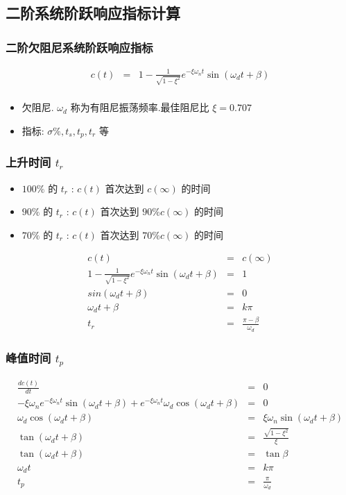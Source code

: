 \documentclass{article}
\begin{document}
\subsection{二阶系统阶跃响应指标计算}
\label{sec-1-3}
\begin{frame}
\frametitle{二阶欠阻尼系统阶跃响应指标}
\label{sec-1-3-1}


\begin{eqnarray*}
   c(t)  &=& 1-\frac{1}{\sqrt{1-\xi^2}}e^{-\xi\omega_n t}\sin(\omega_d t+\beta)\\
\end{eqnarray*}

\begin{itemize}
\item 欠阻尼. $\omega_d$ 称为有阻尼振荡频率.最佳阻尼比 $\xi=0.707$
\item 指标: $\sigma\% , t_s , t_p , t_r$ 等
\end{itemize}
\end{frame}
\begin{frame}
\frametitle{上升时间 $t_r$}
\label{sec-1-3-2}

\begin{itemize}
\item $100\%$ 的 $t_r$ : $c(t)$ 首次达到 $c(\infty)$ 的时间
\item $90\%$ 的 $t_r$ : $c(t)$ 首次达到 $90\%c(\infty)$ 的时间
\item $70\%$ 的 $t_r$ : $c(t)$ 首次达到 $70\%c(\infty)$ 的时间
\end{itemize}

\begin{eqnarray*}
c(t) & = & c(\infty) \\
1-\frac{1}{\sqrt{1-\xi^2}}e^{-\xi\omega_n t}\sin(\omega_d t+\beta) &=& 1 \\
sin(\omega_d t+\beta) &=& 0 \\
\omega_d t+\beta &=& k\pi \\
t_r &=& \frac{\pi-\beta}{\omega_d}
\end{eqnarray*}
\end{frame}
\begin{frame}
\frametitle{峰值时间 $t_p$}
\label{sec-1-3-3}



\begin{eqnarray*}
\frac{dc(t)}{dt} &=& 0 \\
-\xi\omega_n e^{-\xi\omega_n t}\sin(\omega_d t+\beta)+e^{-\xi\omega_n t}\omega_d\cos(\omega_d t+\beta) & = & 0 \\
\omega_d\cos(\omega_d t+\beta) &=& \xi\omega_n \sin(\omega_d t+\beta) \\
\tan(\omega_d t+\beta) &=& \frac{\sqrt{1-\xi^2}}{\xi} \\
\tan(\omega_d t+\beta) &=& \tan\beta \\
\omega_d t &=& k\pi\\
t_p &=& \frac{\pi}{\omega_d}
\end{eqnarray*}
\end{frame}
\end{document}
